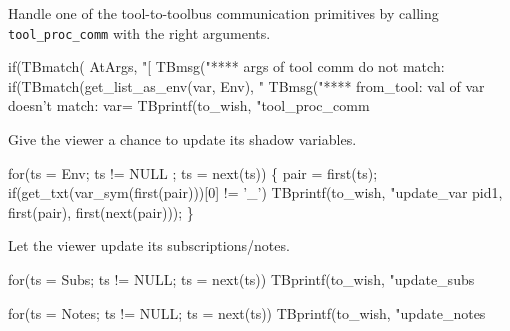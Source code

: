 
Handle one of the tool-to-toolbus communication primitives
by calling {\tt tool\_proc\_comm} with the right arguments.

\nwenddocs{}\endmoddef
  if(TBmatch( AtArgs, "[%
    TBmsg("**** args of tool comm do not match:%
  if(TBmatch(get_list_as_env(var, Env), "%
    TBmsg("**** from_tool: val of var doesn't match: var=%
  TBprintf(to_wish, "tool_proc_comm %
\nwendcode{}\nwdocspar


Give the viewer a chance to update its shadow variables.

\nwenddocs{}\endmoddef
  for(ts = Env; ts != NULL ; ts = next(ts)) \{
    pair = first(ts);
    if(get_txt(var_sym(first(pair)))[0] != '_')
    TBprintf(to_wish, "update_var %
                                pid1, first(pair), first(next(pair)));
  \}
\nwendcode{}\nwdocspar


Let the viewer update its subscriptions/notes.

\nwenddocs{}\endmoddef
  for(ts = Subs; ts != NULL; ts = next(ts))
    TBprintf(to_wish, "update_subs %
\nwendcode{}\nwdocspar

\nwenddocs{}\endmoddef
  for(ts = Notes; ts != NULL; ts = next(ts))
    TBprintf(to_wish, "update_notes %
\nwendcode{}\nwdocspar

